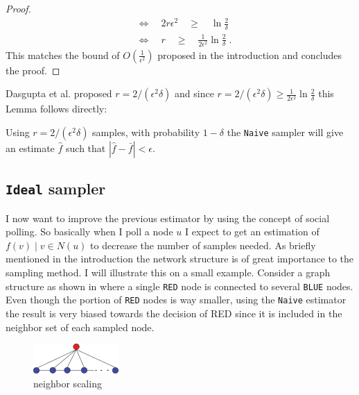 \begin{proof}
\begin{align*}
&\Leftrightarrow\quad 2r\epsilon^2 \quad\geq\quad \ln\frac{2}{\delta}\\
&\Leftrightarrow\quad r \quad\geq\quad \frac{1}{2\epsilon^2}\ln{\frac{2}{\delta}} \;.
\end{align*}
This matches the bound of $O(\frac{1}{\epsilon^2})$ proposed in the introduction and concludes the proof.

\end{proof}

Dasgupta et al. \cite{dasgupta2012social} proposed $r=2/(\epsilon^2\delta)$ and since $r=2/(\epsilon^2\delta) \geq \frac{1}{2\epsilon^2}\ln{\frac{2}{\delta}}$ this Lemma follows directly:
\begin{lemma}
Using $r=2/(\epsilon^2\delta)$ samples, with probability $1-\delta$ the \texttt{Naive} sampler will give an estimate $\hat{f}$ such that $|\hat{f}-\bar{f}|< \epsilon$.
\end{lemma}
\pagebreak
\subsection{\texttt{Ideal} sampler}
I now want to improve the previous estimator by using the concept of social polling. So basically when I poll a node $u$ I expect to get an estimation of ${f(v)\;|\;v \in N(u)}$ to decrease the number of samples needed.
As briefly mentioned in the introduction the network structure is of great importance to the sampling method.
I will illustrate this on a small example. Consider a graph structure as shown in  where a single \texttt{RED} node is connected to several \texttt{BLUE} nodes.
Even though the portion of \texttt{RED} nodes is way smaller, using the \texttt{Naive} estimator the result is very biased towards the decision of {RED} since it is included in the neighbor set of each sampled node.
\begin{figure}[!ht]
  \begin{center}
    \includegraphics{fig1a}
    \caption{neighbor scaling}
  \end{center}
\end{figure}

